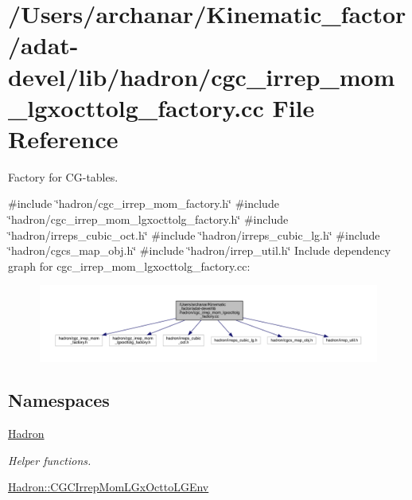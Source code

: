 \hypertarget{adat-devel_2lib_2hadron_2cgc__irrep__mom__lgxocttolg__factory_8cc}{}\section{/\+Users/archanar/\+Kinematic\+\_\+factor/adat-\/devel/lib/hadron/cgc\+\_\+irrep\+\_\+mom\+\_\+lgxocttolg\+\_\+factory.cc File Reference}
\label{adat-devel_2lib_2hadron_2cgc__irrep__mom__lgxocttolg__factory_8cc}


Factory for C\+G-\/tables.  


{\ttfamily \#include \char`\"{}hadron/cgc\+\_\+irrep\+\_\+mom\+\_\+factory.\+h\char`\"{}}\newline
{\ttfamily \#include \char`\"{}hadron/cgc\+\_\+irrep\+\_\+mom\+\_\+lgxocttolg\+\_\+factory.\+h\char`\"{}}\newline
{\ttfamily \#include \char`\"{}hadron/irreps\+\_\+cubic\+\_\+oct.\+h\char`\"{}}\newline
{\ttfamily \#include \char`\"{}hadron/irreps\+\_\+cubic\+\_\+lg.\+h\char`\"{}}\newline
{\ttfamily \#include \char`\"{}hadron/cgcs\+\_\+map\+\_\+obj.\+h\char`\"{}}\newline
{\ttfamily \#include \char`\"{}hadron/irrep\+\_\+util.\+h\char`\"{}}\newline
Include dependency graph for cgc\+\_\+irrep\+\_\+mom\+\_\+lgxocttolg\+\_\+factory.\+cc\+:
\nopagebreak
\begin{figure}[H]
\begin{center}
\leavevmode
\includegraphics[width=350pt]{dd/db5/adat-devel_2lib_2hadron_2cgc__irrep__mom__lgxocttolg__factory_8cc__incl}
\end{center}
\end{figure}
\subsection*{Namespaces}
\begin{DoxyCompactItemize}
\item 
 \mbox{\hyperlink{namespaceHadron}{Hadron}}
\begin{DoxyCompactList}\small\item\em Helper functions. \end{DoxyCompactList}\item 
 \mbox{\hyperlink{namespaceHadron_1_1CGCIrrepMomLGxOcttoLGEnv}{Hadron\+::\+C\+G\+C\+Irrep\+Mom\+L\+Gx\+Octto\+L\+G\+Env}}
\end{DoxyCompactItemize}
